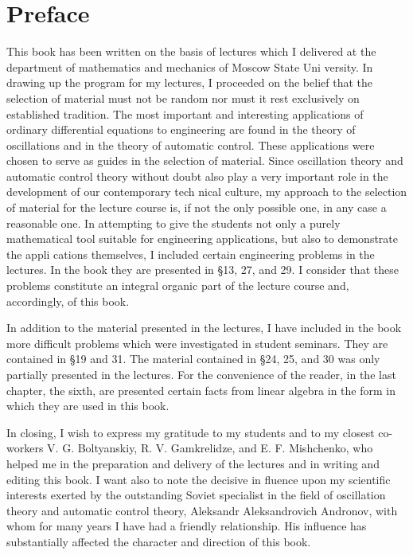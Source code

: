 \documentclass[10pt,a5paper]{book}
\theoremstyle{plain}
\theoremstyle{definition}
\theoremstyle{remark}
\begin{document}
\frontmatter

\chapter*{Preface}
This book has been written on the basis of lectures which I delivered
at the department of mathematics and mechanics of Moscow State Uni­
versity. In drawing up the program for my lectures, I proceeded on the
belief that the selection of material must not be random nor must it rest
exclusively on established tradition. The most important and interesting
applications of ordinary differential equations to engineering are found
in the theory of oscillations and in the theory of automatic control. These
applications were chosen to serve as guides in the selection of material.
Since oscillation theory and automatic control theory without doubt also
play a very important role in the development of our contemporary tech­
nical culture, my approach to the selection of material for the lecture
course is, if not the only possible one, in any case a reasonable one. In
attempting to give the students not only a purely mathematical tool
suitable for engineering applications, but also to demonstrate the appli­
cations themselves, I included certain engineering problems in the lectures.
In the book they are presented in §13, 27, and 29. I consider that these
problems constitute an integral organic part of the lecture course and,
accordingly, of this book.

In addition to the material presented in the lectures, I have included in
the book more difficult problems which were investigated in student
seminars. They are contained in §19 and 31. The material contained
in §24, 25, and 30 was only partially presented in the lectures. For the
convenience of the reader, in the last chapter, the sixth, are presented
certain facts from linear algebra in the form in which they are used in
this book.

In closing, I wish to express my gratitude to my students and to my
closest co-workers V. G. Boltyanskiy, R. V. Gamkrelidze, and E. F.
Mishchenko, who helped me in the preparation and delivery of the lectures
and in writing and editing this book. I want also to note the decisive in­
fluence upon my scientific interests exerted by the outstanding Soviet
specialist in the field of oscillation theory and automatic control theory,
Aleksandr Aleksandrovich Andronov, with whom for many years I have
had a friendly relationship. His influence has substantially affected the
character and direction of this book.
\end{document}
